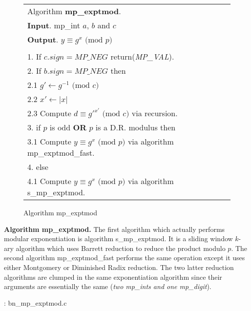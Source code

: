 \documentclass[b5paper]{book}
\begin{document}
\begin{figure}[!here]
\begin{small}
\begin{center}
\begin{tabular}{l}
\hline Algorithm \textbf{mp\_exptmod}. \\
\textbf{Input}.   mp\_int $a$, $b$ and $c$ \\
\textbf{Output}.  $y \equiv g^x \mbox{ (mod }p\mbox{)}$ \\
\hline \\
1.  If $c.sign = MP\_NEG$ return(\textit{MP\_VAL}). \\
2.  If $b.sign = MP\_NEG$ then \\
\hspace{3mm}2.1  $g' \leftarrow g^{-1} \mbox{ (mod }c\mbox{)}$ \\
\hspace{3mm}2.2  $x' \leftarrow \vert x \vert$ \\
\hspace{3mm}2.3  Compute $d \equiv g'^{x'} \mbox{ (mod }c\mbox{)}$ via recursion. \\
3.  if $p$ is odd \textbf{OR} $p$ is a D.R. modulus then \\
\hspace{3mm}3.1  Compute $y \equiv g^{x} \mbox{ (mod }p\mbox{)}$ via algorithm mp\_exptmod\_fast. \\
4.  else \\
\hspace{3mm}4.1  Compute $y \equiv g^{x} \mbox{ (mod }p\mbox{)}$ via algorithm s\_mp\_exptmod. \\
\hline
\end{tabular}
\end{center}
\end{small}
\caption{Algorithm mp\_exptmod}
\end{figure}

\textbf{Algorithm mp\_exptmod.}
The first algorithm which actually performs modular exponentiation is algorithm s\_mp\_exptmod.  It is a sliding window $k$-ary algorithm 
which uses Barrett reduction to reduce the product modulo $p$.  The second algorithm mp\_exptmod\_fast performs the same operation 
except it uses either Montgomery or Diminished Radix reduction.  The two latter reduction algorithms are clumped in the same exponentiation
algorithm since their arguments are essentially the same (\textit{two mp\_ints and one mp\_digit}).  

\vspace{+3mm}\begin{small}
\hspace{-5.1mm}{\bf File}: bn\_mp\_exptmod.c
\vspace{-3mm}
\begin{alltt}
\end{alltt}
\end{small}
\end{document}
